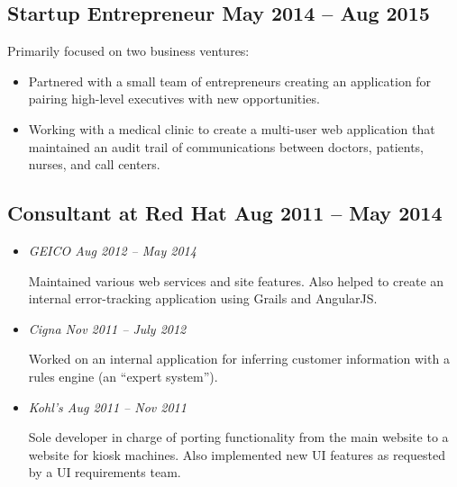 \documentclass[12pt]{article}
\begin{document}
    

\subsection*{Startup Entrepreneur \hfill May 2014 -- Aug 2015}

Primarily focused on two business ventures:

\begin{itemize}
\item Partnered with a small team of entrepreneurs creating an application for
  pairing high-level executives with new opportunities.

\item Working with a medical clinic to create a multi-user web application that
  maintained an audit trail of communications between doctors, patients, nurses,
  and call centers.
\end{itemize}

     
\tag{\LaTeX}

\subsection*{Consultant at Red Hat \hfill Aug 2011 -- May 2014}

\begin{itemize}
\item \textit{GEICO \hfill Aug 2012 -- May 2014}

  Maintained various web services and site features. Also helped to create an
  internal error-tracking application using Grails and AngularJS.

       

\item \textit{Cigna \hfill Nov 2011 -- July 2012}

  Worked on an internal application for inferring customer information with a
  rules engine (an ``expert system'').

   

\item \textit{Kohl's \hfill Aug 2011 -- Nov 2011}

  Sole developer in charge of porting functionality from the main website to a
  website for kiosk machines. Also implemented new UI features as requested by a
  UI requirements team.

   
\end{itemize}
\end{document}
